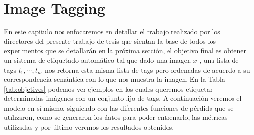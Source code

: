 \chapter{Image Tagging} \label{chapter:chapter3}

En este capitulo nos enfocaremos en detallar el trabajo realizado por los directores del presente trabajo de tesis \cite{PaperDirectors} que sientan la base de todos los experimentos que se detallarán en la próxima sección, el objetivo final es obtener un sistema de etiquetado automático tal que dado una imagen $x$ , una lista de tags $t_{1}, \cdots , t_{n}$, nos retorna esta misma lista de tags pero ordenadas de acuerdo a su correspondencia semántica con lo que nos muestra la imagen. En la Tabla \ref{tab:objetives} podemos ver ejemplos en los cuales queremos etiquetar determinadas imágenes con un conjunto fijo de tags. A continuación veremos el modelo en sí mismo, siguiendo con las diferentes funciones de pérdida que se utilizaron, cómo se generaron los datos para poder entrenarlo, las métricas utilizadas y por último veremos los resultados obtenidos.


